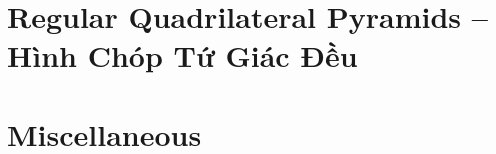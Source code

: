 \documentclass{article}
\begin{document}

\section{Regular Quadrilateral Pyramids -- Hình Chóp Tứ Giác Đều}


\section{Miscellaneous}


\printbibliography[heading=bibintoc]
	
\end{document}
